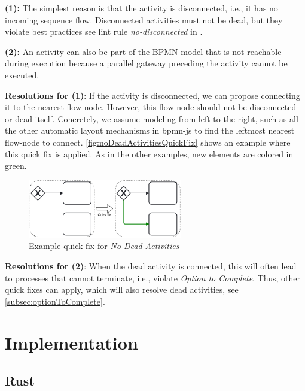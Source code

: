 \documentclass[runningheads]{llncs}
\begin{document}
\textbf{(1):} The simplest reason is that the activity is disconnected, i.e., it has no incoming sequence flow.
Disconnected activities must not be dead, but they violate best practices see lint rule \textit{no-disconnected} in \cite{camundaservicesgmbhBpmnlint2024}.

\textbf{(2):} An activity can also be part of the BPMN model that is not reachable during execution because a parallel gateway preceding the activity cannot be executed.

\textbf{Resolutions for (1)}: If the activity is disconnected, we can propose connecting it to the nearest flow-node.
However, this flow node should not be disconnected or dead itself.
Concretely, we assume modeling from left to the right, such as all the other automatic layout mechanisms in bpmn-js \cite{camundaservicesgmbhBpmnjs2024} to find the leftmost nearest flow-node to connect.
\autoref{fig:noDeadActivitiesQuickFix} shows an example where this quick fix is applied.
As in the other examples, new elements are colored in green.

\begin{figure}[ht]
	\centering
	\includegraphics[width=0.6\textwidth]{images/dead}
	\caption{Example quick fix for \textit{No Dead Activities}}
	\label{fig:noDeadActivitiesQuickFix}
\end{figure}

\textbf{Resolutions for (2)}: When the dead activity is connected, this will often lead to processes that cannot terminate, i.e., violate \textit{Option to Complete}.
Thus, other quick fixes can apply, which will also resolve dead activities, see \autoref{subsec:optionToComplete}.

\section{Implementation}

\subsection{Rust}
\end{document}
